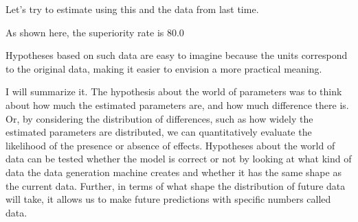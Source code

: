 \documentclass{ltjsbook}
\begin{document}
Let's try to estimate using this and the data from last time.




As shown here, the superiority rate is 80.0%

Hypotheses based on such data are easy to imagine because the units correspond to the original data, making it easier to envision a more practical meaning.

I will summarize it.
The hypothesis about the world of parameters was to think about how much the estimated parameters are, and how much difference there is. Or, by considering the distribution of differences, such as how widely the estimated parameters are distributed, we can quantitatively evaluate the likelihood of the presence or absence of effects.
Hypotheses about the world of data can be tested whether the model is correct or not by looking at what kind of data the data generation machine creates and whether it has the same shape as the current data. Further, in terms of what shape the distribution of future data will take, it allows us to make future predictions with specific numbers called data.
\end{document}
